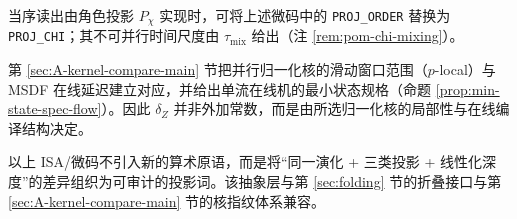 \begin{remark}
当序读出由角色投影 $P_\chi$ 实现时，可将上述微码中的 \texttt{PROJ\_ORDER} 替换为 \texttt{PROJ\_CHI}；其不可并行时间尺度由 $\tau_{\mathrm{mix}}$ 给出（注 \ref{rem:pom-chi-mixing}）。
\end{remark}

\begin{remark}\label{rem:pom-plocal-delay}
第 \ref{sec:A-kernel-compare-main} 节把并行归一化核的滑动窗口范围（$p$-local）与 MSDF 在线延迟建立对应，并给出单流在线机的最小状态规格（命题 \ref{prop:min-state-spec-flow}）。因此 $\delta_Z$ 并非外加常数，而是由所选归一化核的局部性与在线编译结构决定。
\end{remark}

以上 ISA/微码不引入新的算术原语，而是将“同一演化 + 三类投影 + 线性化深度”的差异组织为可审计的投影词。该抽象层与第 \ref{sec:folding} 节的折叠接口与第 \ref{sec:A-kernel-compare-main} 节的核指纹体系兼容。
